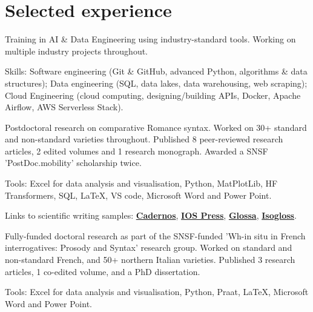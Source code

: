 \documentclass[]{plushcv}
\begin{document}
\begin{minipage}[t]{0.70\textwidth} 



\section{Selected experience}

Training in AI \& Data Engineering using industry-standard tools. Working on multiple industry projects throughout.
\sectionsep
\sectionsep
\begin{tightemize}
\item Skills: Software engineering (Git \& GitHub, advanced Python, algorithms \& data structures); Data engineering (SQL, data lakes, data warehousing, web scraping);
Cloud Engineering (cloud computing, designing/building APIs, Docker, Apache Airflow, AWS Serverless Stack).
\end{tightemize}
\sectionsep

Postdoctoral research on comparative Romance syntax. Worked on 30+ standard and non-standard varieties throughout. Published 8 peer-reviewed research articles, 2 edited volumes and 1 research monograph. Awarded a SNSF 'PostDoc.mobility' scholarship twice.
\sectionsep
\begin{tightemize}
\item Tools: Excel for data analysis and visualisation, Python, MatPlotLib, HF Transformers, SQL, LaTeX, VS code, Microsoft Word and Power Point.
\item Links to scientific writing samples: \href{https://periodicos.unb.br/index.php/cs/article/view/40559/33149}{\textbf{Cadernos}}, \href{https://ebooks.iospress.nl/doi/10.3233/SHTI220702}{\textbf{IOS Press}}, \href{https://doi.org/10.16995/glossa.5714}{\textbf{Glossa}}, \href{https://doi.org/10.5565/rev/isogloss.108}{\textbf{Isogloss}}.
\end{tightemize}
\sectionsep

Fully-funded doctoral research as part of the SNSF-funded 'Wh-in situ in French interrogatives: Prosody and Syntax' research group. Worked on standard and non-standard French, and 50+ northern Italian varieties. Published 3 research articles, 1 co-edited volume, and a PhD dissertation.
\vspace*{-2mm}
\begin{tightemize}
\item Tools: Excel for data analysis and visualisation, Python, Praat, LaTeX, Microsoft Word and Power Point.
\end{tightemize}
\sectionsep


\end{minipage}
\end{document}
